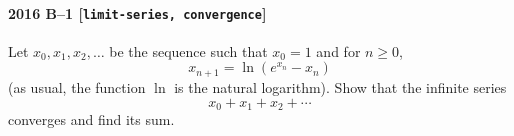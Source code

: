 \paragraph{2016 B--1 \textnormal{[\texttt{limit-series, convergence}]}}
Let $x_0,x_1,x_2,\dots$ be the sequence such that $x_0=1$ and for $n \geq 0$,
\[
x_{n+1} = \ln(e^{x_n} - x_n)
\]
(as usual, the function $\ln$ is the natural logarithm). Show that the infinite series
\[
x_0 + x_1 + x_2 + \cdots
\]
converges and find its sum.
